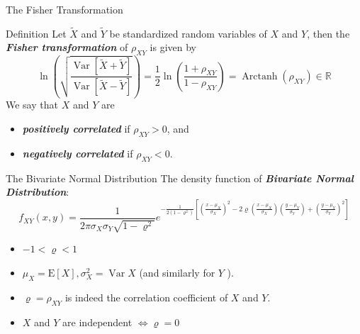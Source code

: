 \documentclass{beamer}
\newcommand{\bb}[1]{\textcolor{antiquefuchsia}{\textbf{\textit{#1}}}}
\begin{document}
\begin{frame}{The Fisher Transformation}
\begin{block}{Definition}
Let $\widetilde{X}$ and $\widetilde{Y}$ be standardized random variables of $X$ and $Y$, then the \bb{Fisher transformation} of $\rho_{X Y}$ is given by
$$\ln \left(\sqrt{\frac{\operatorname{Var}[\widetilde{X}+\widetilde{Y}]}{\operatorname{Var}[\widetilde{X}-\widetilde{Y}]}}\right)=\frac{1}{2} \ln \left(\frac{1+\rho_{X Y}}{1-\rho_{X Y}}\right)=\operatorname{Arctanh}\left(\rho_{X Y}\right) \in \mathbb{R}$$
We say that $X$ and $Y$ are
\begin{itemize}
\item \bb{positively correlated} if $\rho_{X Y}>0$, and
\item \bb{negatively correlated} if $\rho_{X Y}<0$.
\end{itemize}
\end{block}
\end{frame}

\begin{frame}{The Bivariate Normal Distribution}
The density function of \bb{Bivariate Normal Distribution}:
$$
f_{X Y}(x, y)=\frac{1}{2 \pi \sigma_{X} \sigma_{Y} \sqrt{1-\varrho^{2}}} e^{-\frac{1}{2\left(1-\varrho^{2}\right)}\left[\left(\frac{x-\mu_{X}}{\sigma_{X}}\right)^{2}-2 \varrho\left(\frac{x-\mu_{X}}{\sigma_{X}}\right)\left(\frac{y-\mu_{Y}}{\sigma_{Y}}\right)+\left(\frac{y-\mu_{Y}}{\sigma_{Y}}\right)^{2}\right]}
$$
\begin{itemize}
\item $-1<\varrho<1$
\item $\mu_{X}=\mathrm{E}[X], \sigma_{X}^{2}=\operatorname{Var} X$ (and similarly for $Y$ ).
\item $\varrho=\rho_{X Y}$ is indeed the correlation coefficient of $X$ and $Y$.
\item $X$ and $Y$ are independent $\Longleftrightarrow \varrho=0$
\end{itemize}
\end{frame}
\end{document}
